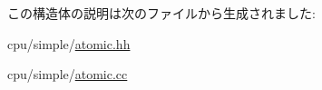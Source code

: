 この構造体の説明は次のファイルから生成されました:\begin{DoxyCompactItemize}
\item 
cpu/simple/\hyperlink{atomic_8hh}{atomic.hh}\item 
cpu/simple/\hyperlink{atomic_8cc}{atomic.cc}\end{DoxyCompactItemize}
